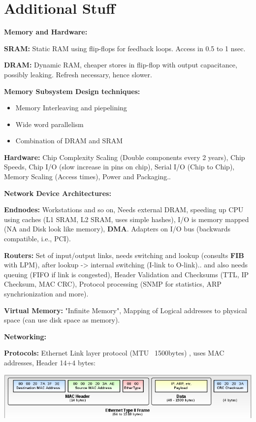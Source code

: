 \chapter{Additional Stuff} \label{CHAP:ADD}

\textbf{Memory and Hardware:}

\textbf{SRAM:} Static RAM using flip-flops for feedback loops. Access in 0.5 to 1 nsec.

\textbf{DRAM:} Dynamic RAM, cheaper stores in flip-flop with output capacitance, possibly leaking. Refresh necessary, hence slower.

\textbf{Memory Subsystem Design techniques:}
\begin{itemize}
    \item Memory Interleaving and piepelining
    \item Wide word parallelism
    \item Combination of DRAM and SRAM
\end{itemize}

\textbf{Hardware:} Chip Complexity Scaling (Double components every 2 years), Chip Speeds, Chip I/O (slow increase in pins on chip), Serial I/O (Chip to Chip), Memory Scaling (Access times), Power and Packaging..

\textbf{Network Device Architectures:}

\textbf{Endnodes:} Workstations and so on, Needs external DRAM, speeding up CPU using caches (L1 SRAM, L2 SRAM, uses simple hashes), I/O is memory mapped (NA and Disk look like memory), \textbf{DMA}. Adapters on I/O bus (backwards compatible, i.e., PCI).

\textbf{Routers:} Set of input/output links, needs switching and lookup (consults \textbf{FIB} with LPM), after lookup -> internal switching (I-link to O-link).. and also needs queuing (FIFO if link is congested), Header Validation and Checksums (TTL, IP Checksum, MAC CRC), Protocol processing (SNMP for statistics, ARP synchrionization and more).

\textbf{Virtual Memory:} "Infinite Memory", Mapping of Logical addresses to physical space (can use disk space as memory).

\textbf{Networking:}

\textbf{Protocols:} Ethernet Link layer protocol (MTU ~1500bytes) , uses MAC addresses, Header 14+4 bytes:

\includegraphics[width=.8\textwidth]{images/chap10/ethernet_header}

